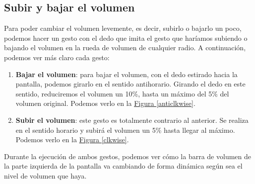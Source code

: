 \documentclass[10pt,a4paper,spanish]{article}
\begin{document}
\subsection{\textcolor{verde}Subir y bajar el volumen}

Para poder cambiar el volumen levemente, es decir, subirlo o bajarlo un poco, podemos hacer un gesto con el dedo que imita el gesto que haríamos subiendo o bajando el volumen en la rueda de volumen de cualquier radio. A continuación, podemos ver más claro cada gesto:

\begin{enumerate}[$\bullet$]
  \item \textbf{\textcolor{verde}{Bajar el volumen}}: para bajar el volumen, con el dedo estirado hacia la pantalla, podemos girarlo en el sentido antihorario. Girando el dedo en este sentido, reduciremos el volumen un 10\%, hasta un máximo del 5\% del volumen original. Podemos verlo en la \hyperref[anticlkwise]{Figura \ref*{anticlkwise}}.
  \item \textbf{\textcolor{verde}{Subir el volumen}}: este gesto es totalmente contrario al anterior. Se realiza en el sentido horario y subirá el volumen un 5\% hasta llegar al máximo. Podemos verlo en la \hyperref[clkwise]{Figura \ref*{clkwise}}.
\end{enumerate}

Durante la ejecución de ambos gestos, podemos ver cómo la barra de volumen de la parte izquierda de la pantalla va cambiando de forma dinámica según sea el nivel de volumen que haya.

\end{document}
